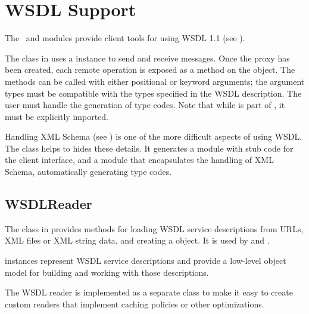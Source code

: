 \chapter{WSDL Support}

The \ZSI~and  modules provide client tools for
using WSDL 1.1
(see ).

The  class in \ZSI{} uses a  instance to send
and receive messages.
Once the proxy has been created, each remote operation is exposed
as a method on the object.
The methods can be called with either positional or keyword arguments;
the argument types must be compatible with the types specified in the
WSDL description.
The user must handle the generation of type codes.
Note that while  is part of \ZSI{}, it must be
explicitly imported.

Handling XML Schema
(see ) 
is one of the more difficult aspects
of using WSDL.  The class  helps to hides these
details.  It generates a module with stub code for the client interface,
and a module that encapsulates the handling of XML Schema, automatically
generating type codes.

\section{WSDLReader}

The  class in  provides
methods for loading WSDL service descriptions from URLs, XML files
or XML string data, and creating a  object.
It is used by  and .

 instances represent WSDL service descriptions and provide 
a low-level object model for building and working with those descriptions.

The WSDL reader is implemented as a 
separate class to make it easy to create custom readers that implement 
caching policies or other optimizations.


